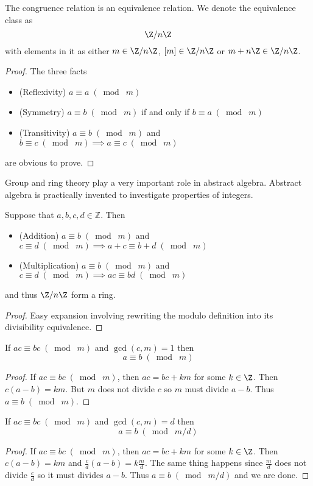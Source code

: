 \documentclass[a4paper]{article}
\begin{document}
\begin{prp}{}{} The congruence relation is an equivalence relation. We denote the equivalence class as $$\Z/n\Z$$ with elements in it as either $m\in\Z/n\Z$, $[m]\in\Z/n\Z$ or $m+n\Z\in\Z/n\Z$. \tcbline
\begin{proof} The three facts
\begin{itemize}
\item (Reflexivity) $a\equiv a\;(\bmod\;m)$
\item (Symmetry) $a\equiv b\;(\bmod\;m)$ if and only if $b\equiv a\;(\bmod\;m)$
\item (Transitivity) $a\equiv b\;(\bmod\;m)$ and $b\equiv c\;(\bmod\;m)\implies a\equiv c\;(\bmod\;m)$
\end{itemize}
are obvious to prove. 
\end{proof}
\end{prp}

Group and ring theory play a very important role in abstract algebra. Abstract algebra is practically invented to investigate properties of integers. 

\begin{prp}{}{} Suppose that $a,b,c,d\in\mathbb{Z}$. Then
\begin{itemize}
\item (Addition) $a\equiv b\;(\bmod\;m)$ and $c\equiv d\;(\bmod\;m)\implies a+c\equiv b+d\;(\bmod\;m)$
\item (Multiplication) $a\equiv b\;(\bmod\;m)$ and $c\equiv d\;(\bmod\;m)\implies ac\equiv bd\;(\bmod\;m)$
\end{itemize} and thus $\Z/n\Z$ form a ring. \tcbline
\begin{proof}
Easy expansion involving rewriting the modulo definition into its divisibility equivalence. 
\end{proof}
\end{prp}

\begin{prp}{}{} If $ac\equiv bc\;(\bmod\;m)$ and $\gcd(c,m)=1$ then $$a\equiv b\;(\bmod\;m)$$ \tcbline
\begin{proof}
If $ac\equiv bc\;(\bmod\;m)$, then $ac=bc+km$ for some $k\in\Z$. Then $c(a-b)=km$. But $m$ does not divide $c$ so $m$ must divide $a-b$. Thus $a\equiv b\;(\bmod\;m)$. 
\end{proof}
\end{prp}

\begin{prp}{}{} If $ac\equiv bc\;(\bmod\;m)$ and $\gcd(c,m)=d$ then $$a\equiv b\;(\bmod\;m/d)$$ \tcbline
\begin{proof}
If $ac\equiv bc\;(\bmod\;m)$, then $ac=bc+km$ for some $k\in\Z$. Then $c(a-b)=km$ and $\frac{c}{d}(a-b)=k\frac{m}{d}$. The same thing happens since $\frac{m}{d}$ does not divide $\frac{c}{d}$ so it must divides $a-b$. Thus $a\equiv b\;(\bmod\;m/d)$ and we are done. 
\end{proof}
\end{prp}
\end{document}
